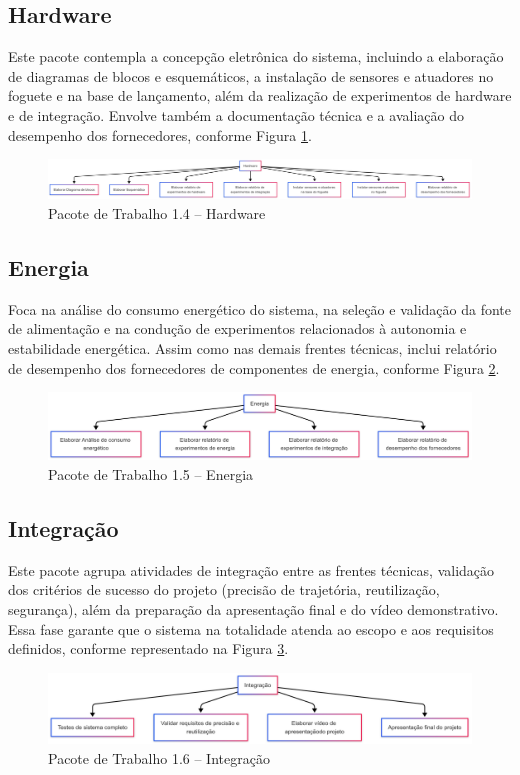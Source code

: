 \subsection{Hardware}

Este pacote contempla a concepção eletrônica do sistema, incluindo a elaboração de diagramas de blocos e esquemáticos, a instalação de sensores e atuadores no foguete e na base de lançamento, além da realização de experimentos de hardware e de integração. Envolve também a documentação técnica e a avaliação do desempenho dos fornecedores, conforme Figura \ref{fig_eap_hardware}.


\begin{figure}[!h]
	\centering
\includegraphics[width=15cm]{figuras/eap_hardware.png}
	\caption{Pacote de Trabalho 1.4 – Hardware}
	\label{fig_eap_hardware} 
\end{figure}

\subsection{Energia}

Foca na análise do consumo energético do sistema, na seleção e validação da fonte de alimentação e na condução de experimentos relacionados à autonomia e estabilidade energética. Assim como nas demais frentes técnicas, inclui relatório de desempenho dos fornecedores de componentes de energia, conforme Figura \ref{fig_eap_energia}.

\begin{figure}[!h]
	\centering
\includegraphics[width=15cm]{figuras/eap_energia.png}
	\caption{Pacote de Trabalho 1.5 – Energia}
	\label{fig_eap_energia} 
\end{figure}

\subsection{Integração}

Este pacote agrupa atividades de integração entre as frentes técnicas, validação dos critérios de sucesso do projeto (precisão de trajetória, reutilização, segurança), além da preparação da apresentação final e do vídeo demonstrativo. Essa fase garante que o sistema na totalidade atenda ao escopo e aos requisitos definidos, conforme representado na Figura \ref{fig_eap_integracao}.

\begin{figure}[!h]
	\centering
\includegraphics[width=15cm]{figuras/eap_integracao.png}
	\caption{Pacote de Trabalho 1.6 – Integração}
	\label{fig_eap_integracao}  
\end{figure}